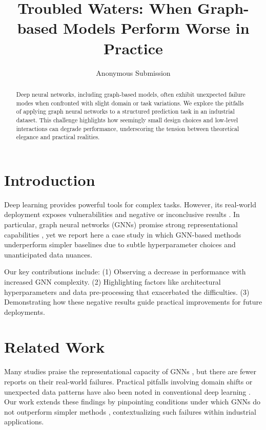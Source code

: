\documentclass[11pt]{article}
\title{Troubled Waters: When Graph-based Models Perform Worse in Practice}
\author{Anonymous Submission}
\date{}
\begin{document}
\maketitle

\begin{abstract}
Deep neural networks, including graph-based models, often exhibit unexpected failure modes when confronted with slight domain or task variations. We explore the pitfalls of applying graph neural networks to a structured prediction task in an industrial dataset. This challenge highlights how seemingly small design choices and low-level interactions can degrade performance, underscoring the tension between theoretical elegance and practical realities.
\end{abstract}

\section{Introduction}
Deep learning provides powerful tools for complex tasks. However, its real-world deployment exposes vulnerabilities and negative or inconclusive results \citep{liang2021nips, turian2020iclr}. In particular, graph neural networks (GNNs) promise strong representational capabilities \citep{kipf2017semi, velickovic2018graph}, yet we report here a case study in which GNN-based methods underperform simpler baselines due to subtle hyperparameter choices and unanticipated data nuances.

Our key contributions include: (1) Observing a decrease in performance with increased GNN complexity. (2) Highlighting factors like architectural hyperparameters and data pre-processing that exacerbated the difficulties. (3) Demonstrating how these negative results guide practical improvements for future deployments.

\section{Related Work}
Many studies praise the representational capacity of GNNs \citep{kipf2017semi, velickovic2018graph}, but there are fewer reports on their real-world failures. Practical pitfalls involving domain shifts or unexpected data patterns have also been noted in conventional deep learning \citep{recht2019imagenet, northcutt2021label}. Our work extends these findings by pinpointing conditions under which GNNs do not outperform simpler methods \citep{wu2019simplifying}, contextualizing such failures within industrial applications.
\end{document}
